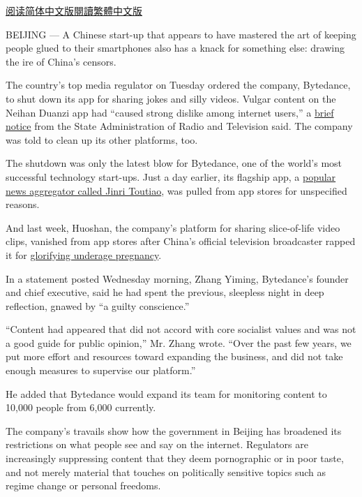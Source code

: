 \href{https://cn.nytimes3xbfgragh.onion/technology/20180412/china-toutiao-bytedance-censor/}{阅读简体中文版}\href{https://cn.nytimes3xbfgragh.onion/technology/20180412/china-toutiao-bytedance-censor/zh-hant/}{閱讀繁體中文版}

BEIJING --- A Chinese start-up that appears to have mastered the art of
keeping people glued to their smartphones also has a knack for something
else: drawing the ire of China's censors.

The country's top media regulator on Tuesday ordered the company,
Bytedance, to shut down its app for sharing jokes and silly videos.
Vulgar content on the Neihan Duanzi app had ``caused strong dislike
among internet users,'' a
\href{http://www.sapprft.gov.cn/sapprft/contents/6582/365922.shtml}{brief
notice} from the State Administration of Radio and Television said. The
company was told to clean up its other platforms, too.

The shutdown was only the latest blow for Bytedance, one of the world's
most successful technology start-ups. Just a day earlier, its flagship
app, a
\href{https://www.nytimes3xbfgragh.onion/2018/01/02/business/china-toutiao-censorship.html}{popular
news aggregator called Jinri Toutiao}, was pulled from app stores for
unspecified reasons.

And last week, Huoshan, the company's platform for sharing slice-of-life
video clips, vanished from app stores after China's official television
broadcaster rapped it for
\href{https://www.nytimes3xbfgragh.onion/2018/04/06/technology/china-censor-teen-moms.html}{glorifying
underage pregnancy}.

In a statement posted Wednesday morning, Zhang Yiming, Bytedance's
founder and chief executive, said he had spent the previous, sleepless
night in deep reflection, gnawed by ``a guilty conscience.''

``Content had appeared that did not accord with core socialist values
and was not a good guide for public opinion,'' Mr. Zhang wrote. ``Over
the past few years, we put more effort and resources toward expanding
the business, and did not take enough measures to supervise our
platform.''

He added that Bytedance would expand its team for monitoring content to
10,000 people from 6,000 currently.

The company's travails show how the government in Beijing has broadened
its restrictions on what people see and say on the internet. Regulators
are increasingly suppressing content that they deem pornographic or in
poor taste, and not merely material that touches on politically
sensitive topics such as regime change or personal freedoms.

